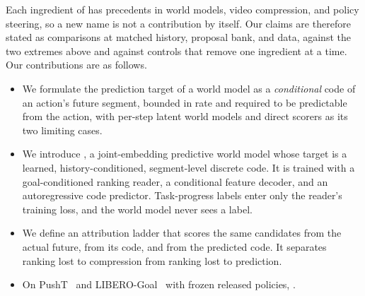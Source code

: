 Each ingredient of \method has precedents in world models, video compression, and policy steering, so a new name is not a contribution by itself.
Our claims are therefore stated as comparisons at matched history, proposal bank, and data, against the two extremes above and against controls that remove one ingredient at a time.
Our contributions are as follows.
\begin{itemize}[leftmargin=*,topsep=2pt,itemsep=1pt]
\item We formulate the prediction target of a world model as a \emph{conditional} code of an action's future segment, bounded in rate and required to be predictable from the action, with per-step latent world models and direct scorers as its two limiting cases.
\item We introduce \method, a joint-embedding predictive world model whose target is a learned, history-conditioned, segment-level discrete code. It is trained with a goal-conditioned ranking reader, a conditional feature decoder, and an autoregressive code predictor. Task-progress labels enter only the reader's training loss, and the world model never sees a label.
\item We define an attribution ladder that scores the same candidates from the actual future, from its code, and from the predicted code. It separates ranking lost to compression from ranking lost to prediction.
\item On PushT~\cite{florence2021ibc,chi2023diffusion} and LIBERO-Goal~\cite{liu2023libero} with frozen released policies, .
\end{itemize}



